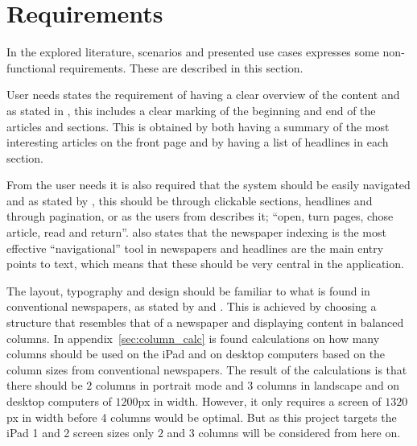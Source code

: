 \section{Requirements}
In the explored literature, scenarios and presented use cases expresses some non-functional requirements. These are described in this section.

User needs states the requirement of having a clear overview of the content and as stated in \cite{FULLTEXT01.pdf}, this includes a clear marking of the beginning and end of the articles and sections. This is obtained by both having a summary of the most interesting articles on the front page and by having a list of headlines in each section.

From the user needs it is also required that the system should be easily navigated and as stated by \cite{kristin-fredrik.pdf}, this should be through clickable sections, headlines and through pagination, or as the users from \cite{FULLTEXT01.pdf} describes it; ``open, turn pages, chose article, read and return''. \cite{FULLTEXT01.pdf} also states that the newspaper indexing is the most effective ``navigational'' tool in newspapers and headlines are the main entry points to text, which means that these should be very central in the application.

The layout, typography and design should be familiar to what is found in conventional newspapers, as stated by \cite{FULLTEXT01.pdf} and \cite{hcii2005-1004.pdf}. This is achieved by choosing a structure that resembles that of a newspaper and displaying content in balanced columns. In appendix~\vref{sec:column_calc} is found calculations on how many columns should be used on the iPad and on desktop computers based on the column sizes from conventional newspapers. The result of the calculations is that there should be $2$ columns in portrait mode and $3$ columns in landscape and on desktop computers of $1200$px in width. However, it only requires a screen of $1320$px in width before 4 columns would be optimal. But as this project targets the iPad 1 and 2 screen sizes only $2$ and $3$ columns will be considered from here on.

